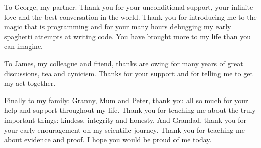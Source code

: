 To George, my partner. Thank you for your unconditional support, your infinite love and the best conversation in the world. Thank you for introducing me to the magic that is programming and for your many hours debugging my early spaghetti attempts at writing code. You have brought more to my life than you can imagine.

To James, my colleague and friend, thanks are owing for many years of great discussions, tea and cynicism. Thanks for your support and for telling me to get my act together.

Finally to my family: Granny, Mum and Peter, thank you all so much for your help and support throughout my life. Thank you for teaching me about the truly important things: kindess, integrity and honesty. And Grandad, thank you for your early enouragement on my scientific journey. Thank you for teaching me about evidence and proof. I hope you would be proud of me today. 